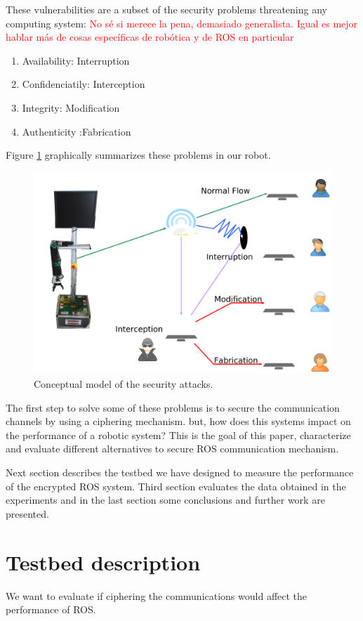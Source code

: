 \documentclass[journal,twoside]{JoPhA}
\begin{document}
These vulnerabilities are a subset of the security problems threatening any computing system:
{\textcolor{red}{No sé si merece la pena, demasiado generalista. Igual es mejor hablar más de cosas específicas de robótica y de ROS en particular}}
\begin{enumerate}
 \item Availability: Interruption
 \item Confidenciatily: Interception
 \item Integrity: Modification
 \item Authenticity :Fabrication
\end{enumerate}

Figure \ref{fig:Conceptualmodel} graphically summarizes these problems in our robot.

\begin{figure}[ht]
    \centering
    \includegraphics[width=.5\textwidth]{SecurityAttacks.pdf}
    \caption{Conceptual model of the security attacks.}
  \label{fig:Conceptualmodel}
\end{figure}

The first step to solve some of these problems is to secure the communication channels by using a ciphering mechanism. but, how does this systems impact on the performance of a robotic system? This is the goal of this paper, characterize and evaluate different alternatives to secure ROS communication mechanism.

Next section describes the testbed we have designed to measure the performance of the encrypted ROS system. Third section evaluates the data obtained in the experiments and in the last section some conclusions and further work are presented.



\section{Testbed description}

We want to evaluate if ciphering the communications would affect the performance of ROS. 
\end{document}
